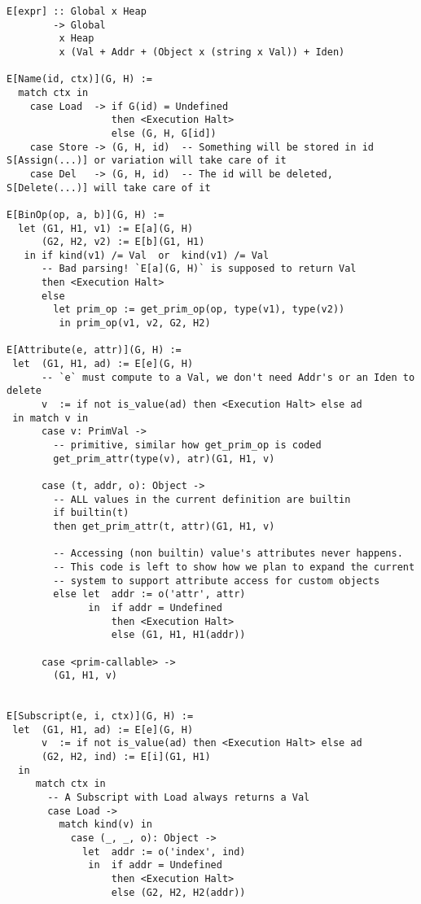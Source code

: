 \begin{verbatim}
E[expr] :: Global x Heap
        -> Global
         x Heap
         x (Val + Addr + (Object x (string x Val)) + Iden)

E[Name(id, ctx)](G, H) :=
  match ctx in
    case Load  -> if G(id) = Undefined
                  then <Execution Halt>
                  else (G, H, G[id])
    case Store -> (G, H, id)  -- Something will be stored in id S[Assign(...)] or variation will take care of it
    case Del   -> (G, H, id)  -- The id will be deleted, S[Delete(...)] will take care of it

E[BinOp(op, a, b)](G, H) :=
  let (G1, H1, v1) := E[a](G, H)
      (G2, H2, v2) := E[b](G1, H1)
   in if kind(v1) /= Val  or  kind(v1) /= Val
      -- Bad parsing! `E[a](G, H)` is supposed to return Val
      then <Execution Halt>
      else
        let prim_op := get_prim_op(op, type(v1), type(v2))
         in prim_op(v1, v2, G2, H2)

E[Attribute(e, attr)](G, H) :=
 let  (G1, H1, ad) := E[e](G, H)
      -- `e` must compute to a Val, we don't need Addr's or an Iden to delete
      v  := if not is_value(ad) then <Execution Halt> else ad
 in match v in
      case v: PrimVal ->
        -- primitive, similar how get_prim_op is coded
        get_prim_attr(type(v), atr)(G1, H1, v)

      case (t, addr, o): Object ->
        -- ALL values in the current definition are builtin
        if builtin(t)
        then get_prim_attr(t, attr)(G1, H1, v)

        -- Accessing (non builtin) value's attributes never happens.
        -- This code is left to show how we plan to expand the current
        -- system to support attribute access for custom objects
        else let  addr := o('attr', attr)
              in  if addr = Undefined
                  then <Execution Halt>
                  else (G1, H1, H1(addr))

      case <prim-callable> ->
        (G1, H1, v)


E[Subscript(e, i, ctx)](G, H) :=
 let  (G1, H1, ad) := E[e](G, H)
      v  := if not is_value(ad) then <Execution Halt> else ad
      (G2, H2, ind) := E[i](G1, H1)
  in
     match ctx in
       -- A Subscript with Load always returns a Val
       case Load ->
         match kind(v) in
           case (_, _, o): Object ->
             let  addr := o('index', ind)
              in  if addr = Undefined
                  then <Execution Halt>
                  else (G2, H2, H2(addr))


\end{verbatim}
